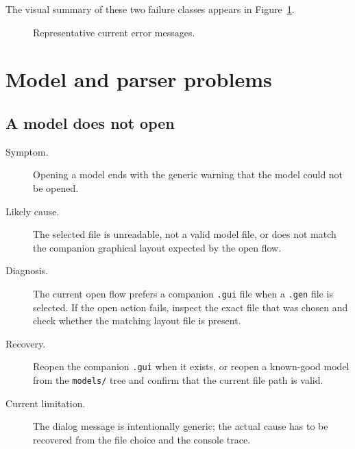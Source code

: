 The visual summary of these two failure classes appears in
Figure~\ref{fig:troubleshooting-error-examples}.

\begin{figure}[htbp]
\centering
\caption{Representative current error messages.}
\label{fig:troubleshooting-error-examples}
\end{figure}

\section{Model and parser problems}
\label{sec:troubleshooting-model-parser}

\subsection{A model does not open}
\label{subsec:troubleshooting-open-model}

\begin{description}
\item[Symptom.] Opening a model ends with the generic warning that the model
could not be opened.
\item[Likely cause.] The selected file is unreadable, not a valid model file,
or does not match the companion graphical layout expected by the open flow.
\item[Diagnosis.] The current open flow prefers a companion \texttt{.gui}
file when a \texttt{.gen} file is selected. If the open action fails, inspect
the exact file that was chosen and check whether the matching layout file is
present.
\item[Recovery.] Reopen the companion \texttt{.gui} when it exists, or reopen a
known-good model from the \texttt{models/} tree and confirm that the current
file path is valid.
\item[Current limitation.] The dialog message is intentionally generic; the
actual cause has to be recovered from the file choice and the console trace.
\end{description}

